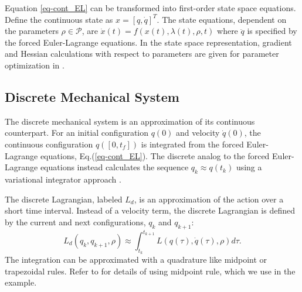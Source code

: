 \documentclass[letterpaper, 10pt, conference]{ieeeconf}
\begin{document}
Equation \ref{eq-cont_EL} can be transformed into first-order state space equations.  Define the continuous state as $x = [q,\dot{q}]^T$.  The state equations, dependent on the parameters $\rho\in\mathcal{P}$, are $\dot{x}(t) = f(x(t),\lambda(t),\rho,t)$ where $\ddot{q}$ is specified by the forced Euler-Lagrange equations.  In the state space representation, gradient and Hessian calculations with respect to parameters are given for parameter optimization in \cite{miller_murphey}.

\subsection{Discrete Mechanical System}
The discrete mechanical system is an approximation of its continuous counterpart.  For an initial configuration $q(0)$ and velocity $\dot{q}(0)$, the continuous configuration $q([0,t_f])$ is integrated from the forced Euler-Lagrange equations, Eq.(\ref{eq-cont_EL}).  The discrete analog to the forced Euler-Lagrange equations instead calculates the sequence $q_k\approx q(t_k)$ using a variational integrator approach \cite{johnson_murphey_scalable}.  

The discrete Lagrangian, labeled $L_d$, is an approximation of the action over a short time interval.  Instead of a velocity term, the discrete Lagrangian is defined by the current and next configurations, $q_k$ and $q_{k+1}$:
\begin{equation}
L_d(q_k,q_{k+1},\rho) \approx \int_{t_k}^{t_{k+1}}L(q(\tau),\dot{q}(\tau),\rho)d\tau.
\label{eq-Ld}
\end{equation}
The integration can be approximated with a quadrature like midpoint or trapezoidal rules.  Refer to \cite{johnson_murphey_scalable} for details of using midpoint rule, which we use in the example.  
\end{document}
